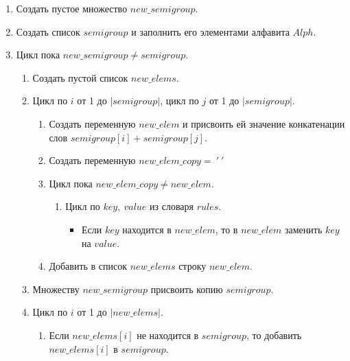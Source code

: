 \documentclass[bachelor, och, labwork]{shiza}
\begin{document}
\begin{enumerate}
   \item Создать пустое множество $new\_semigroup$.
   \item Создать список $semigroup$ и заполнить его элементами алфавита $Alph$.
   \item Цикл пока $new\_semigroup \not = semigroup$.
        \begin{enumerate}
            \item Создать пустой список $new\_elems$.
            \item Цикл по $i$ от 1 до $|semigroup|$, цикл по $j$ от 1 до $|semigroup|$.
                \begin{enumerate}
                    \item Создать переменную $new\_elem$ и присвоить ей значение 
                    конкатенации слов $semigroup[i] + semigroup[j]$.
                    \item Создать переменную $new\_elem\_copy = ~'~'$
                    \item Цикл пока $new\_elem\_copy \not = new\_elem$.
                        \begin{enumerate}
                            \item Цикл по $key,~value$ из словаря $rules$.
                                \begin{itemize}
                                    \item Если $key$ находится в $new\_elem$, то 
                                    в $new\_elem$ заменить $key$ на $value$. 
                                \end{itemize}
                        \end{enumerate}
                    \item Добавить в список $new\_elems$ строку $new\_elem$.
                \end{enumerate}
            \item Множеству $new\_semigroup$ присвоить копию $semigroup$.
            \item Цикл по $i$ от 1 до $|new\_elems|$.
                \begin{enumerate}
                    \item Если $new\_elems[i]$ не находится в $semigroup$, то
                    добавить \\$new\_elems[i]$ в $semigroup$.
                \end{enumerate}
        \end{enumerate}

\end{enumerate}
\end{document}
